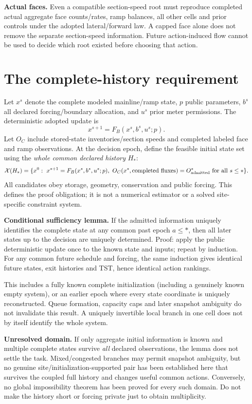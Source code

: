 \documentclass[10pt,a4paper]{article}
\begin{document}
\textbf{Actual faces.} Even a compatible section-speed root must reproduce
completed actual aggregate face counts/rates, ramp balances, all other cells
and prior controls under the adopted lateral/forward law. A capped face alone
does not remove the separate section-speed information. Future action-induced
flow cannot be used to decide which root existed before choosing that action.
\newpage

\section{The complete-history requirement}
Let $x^s$ denote the complete modeled mainline/ramp state, $p$ public parameters,
$b^s$ all declared forcing/boundary allocation, and $u^s$ prior meter permissions.
The deterministic adopted update is
\begin{equation}
x^{s+1}=F_B(x^s,b^s,u^s;p).
\end{equation}
Let $O_C$ include stored-state inventories/section speeds and completed labeled
face and ramp observations. At the decision epoch, define the feasible initial
state set using the \emph{whole common declared history} $H_*$:
\begin{equation}
\mathcal X(H_*)=\{x^0:\ x^{s+1}=F_B(x^s,b^s,u^s;p),\
O_C(x^s,\text{completed fluxes})=O^s_{\rm admitted}\ \text{for all }s\leq *\}.
\end{equation}
All candidates obey storage, geometry, conservation and public forcing. This
defines the proof obligation; it is not a numerical estimator or a solved
site-specific constraint system.

\textbf{Conditional sufficiency lemma.} If the admitted information uniquely
identifies the complete state at any common past epoch $a\leq *$, then all later
states up to the decision are uniquely determined. Proof: apply the public
deterministic update once to the known state and inputs; repeat by induction.
For any common future schedule and forcing, the same induction gives identical
future states, exit histories and TST, hence identical action rankings.

This includes a fully known complete initialization (including a genuinely
known empty system), or an earlier epoch where every state coordinate is
uniquely reconstructed. Queue formation, capacity caps and later snapshot
ambiguity do not invalidate this result. A uniquely invertible local branch
in one cell does not by itself identify the whole system.

\textbf{Unresolved domain.} If only aggregate initial information is known
and multiple complete states survive \emph{all} declared observations, the
lemma does not settle the task. Mixed/congested branches may permit snapshot
ambiguity, but no genuine site/initialization-supported pair has been
established here that survives the coupled full history and changes useful
common actions. Conversely, no global impossibility theorem has been proved
for every such domain. Do not make the history short or forcing private just
to obtain multiplicity.
\end{document}
